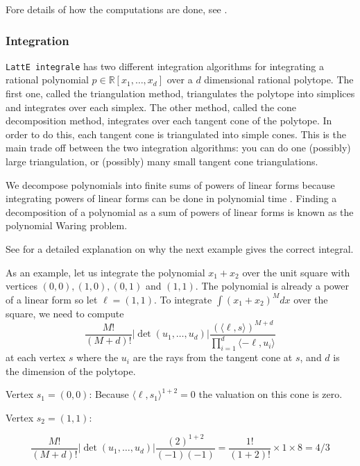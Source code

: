 \documentclass{article}
\newcommand{\R}{{\mathbb R}}
\newcommand{\latteInt}{{\tt LattE integrale}\xspace}
\begin{document}
Fore details of how the computations are done, see \cite{koeppe:irrational-barvinok, latte1} .


\subsubsection{Integration}

\latteInt has two different integration algorithms for integrating a rational polynomial $p \in \R[x_1, \dots, x_d]$ over a $d$ dimensional rational polytope. The first one, called the triangulation method, triangulates the polytope into simplices and integrates over each simplex. The other method, called the cone decomposition method, integrates over each tangent cone of the polytope. In order to do this, each tangent cone is triangulated into simple cones. This is the main trade off between the two integration algorithms: you can do one (possibly) large triangulation, or (possibly) many small tangent cone triangulations. 

We decompose polynomials into finite sums of powers of linear forms because
integrating powers of linear forms can be done in polynomial time
\cite{howToIntegratePolynomialSimplex}. Finding a decomposition of a
polynomial as a sum of powers of linear forms is known as the polynomial
Waring problem. 

See \cite{latte-integrale-paper} for a detailed explanation on why the next example gives the correct integral. 

As an example, let us integrate the polynomial $x_1+x_2$ over the unit square with vertices $(0,0), (1,0), (0,1)$ and $(1,1)$. The polynomial is already a power of a linear form so let $\ell = (1,1)$. To integrate $\int (x_1+x_2)^M dx$ over the square, we need to compute
\begin{displaymath}
        \frac{M!}{(M+d)!} |\det(u_1, \dots, u_d)| \frac{(\langle \ell, s \rangle)^{M+d}}{\prod_{i=1}^d  \langle -\ell, u_i \rangle}
\end{displaymath}
at each vertex $s$ where the $u_i$ are the rays from the tangent cone at $s$, and $d$ is the dimension of the polytope.

Vertex $s_1 = (0,0)$: Because $\langle \ell, s_1 \rangle ^{1+2} = 0$ the valuation on this cone is zero.

Vertex $s_2 = (1,1)$: 

\begin{displaymath}
 \frac{M!}{(M+d)!} |\det(u_1, \dots, u_d)| \frac{(2)^{1+2}}{(-1)(-1)} = \frac{1!}{(1+2)!} \times 1 \times 8 = 4/3
\end{displaymath}
\end{document}
